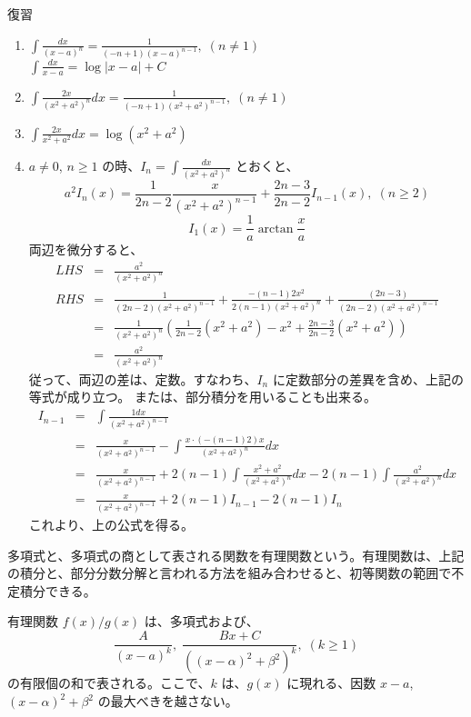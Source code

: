 \newpage{}
{\gt 復習 }
\begin{enumerate}
\item ${\displaystyle \int \frac{dx}{(x-a)^n} = \frac{1}{(-n+1)(x-a)^{n-1}}, \; (n\neq 1)}$\\
${\displaystyle \int \frac{dx}{x-a} = \log|x-a| + C}$
\item ${\displaystyle \int \frac{2x}{(x^2+a^2)^n} dx = \frac{1}{(-n+1)(x^2+a^2)^{n-1}},\;(n\neq 1)}$
\item ${\displaystyle \int \frac{2x}{x^2+a^2} dx = \log(x^2+a^2)}$
\item $a\neq 0$, $n\geq 1$ の時、${\displaystyle I_n = \int\frac{dx}{(x^2+a^2)^n}}$ とおくと、
$$ a^2I_n(x) = \frac{1}{2n-2}\frac{x}{(x^2+a^2)^{n-1}} + \frac{2n-3}{2n-2}I_{n-1}(x),\;(n\geq 2)$$
$$ I_1(x) = \frac{1}{a}\arctan\frac{x}{a}$$
\proof
両辺を微分すると、
\begin{eqnarray*}
LHS & = & \frac{a^2}{(x^2+a^2)^{n}}\\
RHS & = & \frac{1}{(2n-2)(x^2+a^2)^{n-1}} 
+\frac{-(n-1)2x^2}{2(n-1)(x^2+a^2)^{n}} + \frac{(2n-3)}{(2n-2)(x^2+a^2)^{n-1}}\\
& = & \frac{1}{(x^2+a^2)^n}\left(\frac{1}{2n-2}(x^2+a^2) -x^2 + \frac{2n-3}{2n-2}(x^2+a^2)\right)
\\
& = & \frac{a^2}{(x^2+a^2)^{n}}
\end{eqnarray*}
従って、両辺の差は、定数。すなわち、$I_n$ に定数部分の差異を含め、上記の等式が成り立つ。
または、部分積分を用いることも出来る。
\begin{eqnarray*}
I_{n-1} & = & \int\frac{1dx}{(x^2+a^2)^{n-1}} \\
	& = & \frac{x}{(x^2+a^2)^{n-1}} - \int \frac{x\cdot (-(n-1)2)
	x}{(x^2+a^2)^{n}}dx\\
	& = & \frac{x}{(x^2+a^2)^{n-1}} + 2(n-1)\int\frac{x^2+a^2}{(x^2+a^2)^{n}}dx -
	2(n-1)\int\frac{a^2}{(x^2+a^2)^{n}}dx\\
	& = &  \frac{x}{(x^2+a^2)^{n-1}} + 2(n-1)I_{n-1} - 2(n-1)I_n
\end{eqnarray*}
これより、上の公式を得る。
\end{enumerate}

多項式と、多項式の商として表される関数を{\gt 有理関数}という。有理関数は、上記の積分と、部分分数分解と言われる方法を組み合わせると、初等関数の範囲で不定積分できる。

\begin{lemma}
有理関数 $f(x)/g(x)$ は、多項式および、
$$\frac{A}{(x-a)^k},\;\frac{Bx+C}{((x-\alpha)^2+\beta^2)^k}, \;(k\geq 1)$$
の有限個の和で表される。ここで、$k$ は、$g(x)$ に現れる、因数 $x-a$, $(x-\alpha)^2+
\beta^2$ の最大べきを越さない。
\end{lemma}

